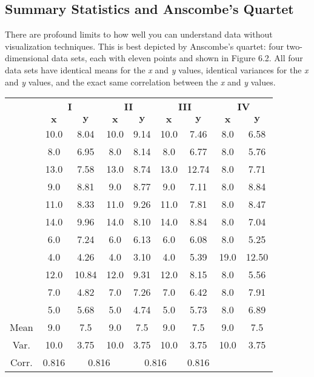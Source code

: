 \documentclass[10pt]{article}
\begin{document}
\subsection{Summary Statistics and Anscombe's Quartet}

There are profound limits to how well you can understand data without visualization techniques. This is best depicted by Anscombe's quartet: four two-dimensional data sets, each with eleven points and shown in Figure 6.2. All four data sets have identical means for the \emph{x} and \emph{y} values, identical variances for the \emph{x} and \emph{y} values, and the exact same correlation between the \emph{x} and \emph{y} values.

\vspace{1em}

\begin{center}
\begin{tabular}{ccc|cc|cc|cc}
 & \multicolumn{2}{c|}{\textbf{I}} & \multicolumn{2}{c|}{\textbf{II}} & \multicolumn{2}{c|}{\textbf{III}} & \multicolumn{2}{c}{\textbf{IV}} \\
 & $\mathbf{x}$ & $\mathbf{y}$ & $\mathbf{x}$ & $\mathbf{y}$ & $\mathbf{x}$ & $\mathbf{y}$ & $\mathbf{x}$ & $\mathbf{y}$ \\
\hline
 & 10.0 & 8.04 & 10.0 & 9.14 & 10.0 & 7.46 & 8.0 & 6.58 \\
 & 8.0 & 6.95 & 8.0 & 8.14 & 8.0 & 6.77 & 8.0 & 5.76 \\
 & 13.0 & 7.58 & 13.0 & 8.74 & 13.0 & 12.74 & 8.0 & 7.71 \\
 & 9.0 & 8.81 & 9.0 & 8.77 & 9.0 & 7.11 & 8.0 & 8.84 \\
 & 11.0 & 8.33 & 11.0 & 9.26 & 11.0 & 7.81 & 8.0 & 8.47 \\
 & 14.0 & 9.96 & 14.0 & 8.10 & 14.0 & 8.84 & 8.0 & 7.04 \\
 & 6.0 & 7.24 & 6.0 & 6.13 & 6.0 & 6.08 & 8.0 & 5.25 \\
 & 4.0 & 4.26 & 4.0 & 3.10 & 4.0 & 5.39 & 19.0 & 12.50 \\
 & 12.0 & 10.84 & 12.0 & 9.31 & 12.0 & 8.15 & 8.0 & 5.56 \\
 & 7.0 & 4.82 & 7.0 & 7.26 & 7.0 & 6.42 & 8.0 & 7.91 \\
 & 5.0 & 5.68 & 5.0 & 4.74 & 5.0 & 5.73 & 8.0 & 6.89 \\
\hline
Mean & 9.0 & 7.5 & 9.0 & 7.5 & 9.0 & 7.5 & 9.0 & 7.5 \\
Var. & 10.0 & 3.75 & 10.0 & 3.75 & 10.0 & 3.75 & 10.0 & 3.75 \\
Corr. & 0.816 & \multicolumn{2}{c}{0.816} & \multicolumn{2}{c}{0.816} & 0.816 & & \\
\end{tabular}
\end{center}
\end{document}
